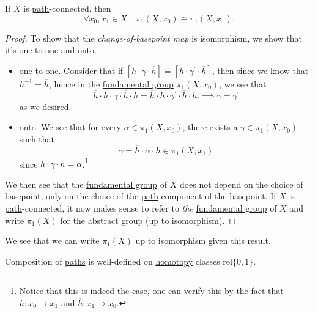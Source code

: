 \begin{theorem}\label{thm:lec8}
	If \(X\) is \hyperref[def:path]{path}-connected, then
	\[
		\forall x_0, x_1\in X\quad \pi_1(X, x_0)\cong \pi _1(X, x_1).
	\]
\end{theorem}
\begin{proof}
	\par To show that the \emph{change-of-basepoint map} is isomorphism, we show that it's one-to-one and onto.
	\begin{itemize}
		\item one-to-one. Consider that if \([h\cdot \gamma\cdot \overline{h} ] = [h\cdot \gamma ^\prime \cdot \overline{h} ]\), then since we know that \(h^{-1}  = \overline{h} \), hence
		      in the \hyperref[def:fundamental-group]{fundamental group} \(\pi _1(X, x_0)\), we see that
		      \[
			      \overline{h} \cdot h\cdot \gamma\cdot \overline{h} \cdot h = \overline{h} \cdot h\cdot \gamma ^\prime \cdot \overline{h} \cdot h. \implies \gamma = \gamma ^\prime
		      \]
		      as we desired.
		\item onto. We see that for every \(\alpha \in \pi_1(X, x_0)\), there exists a \(\gamma\in \pi_1(X, x_{0})\) such that
		      \[
			      \gamma = \overline{h} \cdot \alpha \cdot h\in \pi _1(X, x_1)
		      \]
		      since \(h\cdot \gamma\cdot \overline{h} =\alpha \).\footnote{Notice that this is indeed the case, one can verify this by the fact that \(h\colon x_{0}\to x_1\) and \(\overline{h} \colon x_1 \to x_0\).}
	\end{itemize}

	\par We then see that the \hyperref[def:fundamental-group]{fundamental group} of \(X\) does not depend on the choice of basepoint, only on the choice of the \hyperref[def:path]{path} component of the basepoint.
	If \(X\) is \hyperref[def:path]{path}-connected, it now makes sense to refer to \emph{the} \hyperref[def:fundamental-group]{fundamental group} of \(X\) and write \(\pi _1(X)\) for the abstract group (up to isomorphism).
\end{proof}
\begin{remark}
	We see that we can write \(\pi _1(X)\) up to isomorphism given this result.
\end{remark}

\begin{exercise}
	Composition of \hyperref[def:path]{paths} is well-defined on \hyperref[def:homotopy]{homotopy} classes \hyperref[def:homotopy-relative]{\(\mathrm{rel} \{0, 1\}\)}.
\end{exercise}

